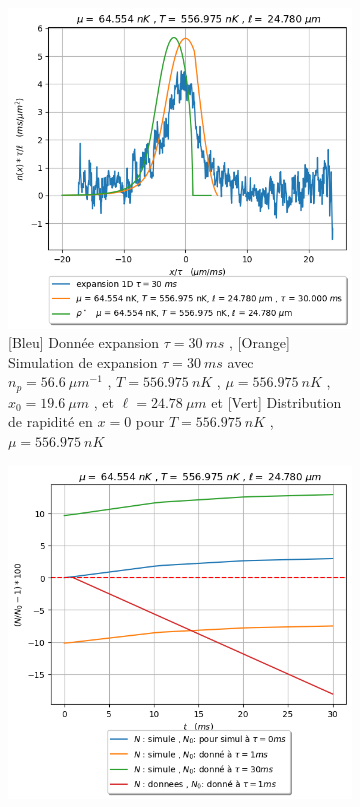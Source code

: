 \documentclass[a3, 10pt,twoside]{article}          %
\theoremstyle{plain}
\theoremstyle{definition}
\theoremstyle{remark}
\theoremstyle{definition} %
\def\OliveGreen{OliveGreen}
\begin{document}
\begin{figure}[!ht]
     		\begin{subfigure}[b]{0.45\textwidth}
        		\centering
        		\includegraphics[width=\textwidth]{Figures/simul_expansion_30_24-04-2024}
        		\caption{{\color{blue}[Bleu] Donnée  expansion $\tau = 30~ms$} , {\color{orange}[Orange] Simulation de  expansion $\tau = 30~ms$ avec $n_p = 56.6 ~{\mu m}^{-1}$ , $T = 556.975 ~nK$ , $\mu=556.975 ~nK$ , $x_0 = 19.6~\mu m$ , et $\ell = 24.78~\mu m$} et {\color{\OliveGreen}[Vert] Distribution de rapidité en $x = 0$ pour  $T = 556.975 ~nK$ , $\mu=556.975 ~nK$} }
        		\label{fig:expansion30}
    		\end{subfigure}
    		\hfill
    		\begin{subfigure}[b]{0.45\textwidth}
        		\centering
        		\includegraphics[width=\textwidth]{Figures/Nat}

\end{subfigure}
\end{figure}
\end{document}
